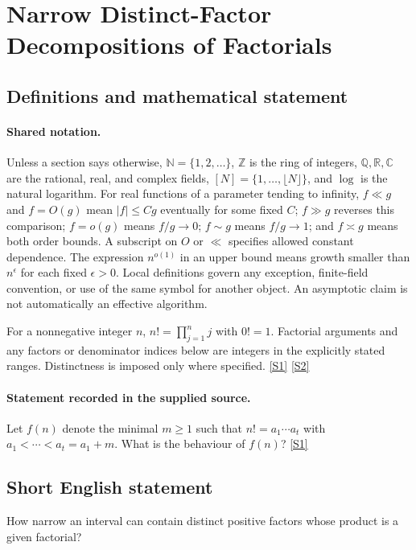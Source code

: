 \documentclass[11pt,a4paper]{article}
\newcommand{\N}{\mathbb{N}}
\newcommand{\Z}{\mathbb{Z}}
\newcommand{\Q}{\mathbb{Q}}
\newcommand{\R}{\mathbb{R}}
\newcommand{\C}{\mathbb{C}}
\newcommand{\sref}[2]{\hyperlink{source:#1:#2}{[S#2]}}
\begin{document}
\section{Narrow Distinct-Factor Decompositions of Factorials}\label{statement}


\subsection{Definitions and mathematical statement}

\paragraph{Shared notation.}Unless a section says otherwise, $\N=\{1,2,\ldots\}$,
$\Z$ is the ring of integers, $\Q,\R,\C$ are the rational, real, and complex
fields, $[N]=\{1,\ldots,\lfloor N\rfloor\}$, and $\log$ is the natural
logarithm. For real functions of a parameter tending to infinity,
$f\ll g$ and $f=O(g)$ mean $|f|\leq Cg$ eventually for some fixed $C$;
$f\gg g$ reverses this comparison; $f=o(g)$ means $f/g\to0$;
$f\sim g$ means $f/g\to1$; and $f\asymp g$ means both order bounds.
A subscript on $O$ or $\ll$ specifies allowed constant dependence.
The expression $n^{o(1)}$ in an upper bound means growth smaller than
$n^\epsilon$ for each fixed $\epsilon>0$. Local definitions govern any
exception, finite-field convention, or use of the same symbol for another
object. An asymptotic claim is not automatically an effective algorithm.



For a nonnegative integer $n$, $n!=\prod_{j=1}^n j$ with $0!=1$. Factorial arguments and any factors or denominator indices below are integers in the explicitly stated ranges. Distinctness is imposed only where specified. \sref{statement}{1} \sref{statement}{2}

\paragraph{Statement recorded in the supplied source.}
Let $f(n)$ denote the minimal $m\geq 1$ such that $ n! = a_1\cdots a_t $ with $a_1<\cdots <a_t=a_1+m$. What is the behaviour of $f(n)$? \sref{statement}{1}

\subsection{Short English statement}

How narrow an interval can contain distinct positive factors whose product is a given factorial?
\end{document}

